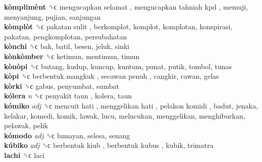 \textbf{kòmplimènt} ␝ϲ   mengucapkan selamat ,  mengucapkan tahniah kpd , memuji, menyanjung, pujian, sanjungan  \\
\textbf{kòmplòt} ␝ϲ   pakatan sulit , berkomplot, komplot, komplotan, konspirasi, pakatan, pengkomplotan, persubahatan  \\
\textbf{kònchi} ␝ϲ  bak, batil, besen, jeluk, sinki  \\
\textbf{kònkòmber} ␝ϲ  ketimun, mentimun, timun  \\
\textbf{kònòpi} ␝ϲ  butang, kudup, kuncup, kuntum, punat, putik, tombol, tunas  \\
\textbf{kòpi} ␝ϲ   berbentuk mangkuk ,  secawan penuh , cangkir, cawan, gelas  \\
\textbf{kòrki} ␝ϲ  gabus, penyumbat, sumbat  \\
\textbf{kólera} \emph{n}  ␝ϲ   penyakit taun , kolera, taun  \\
\textbf{kómiko} \emph{adj}  ␝ϲ   mencuit hati ,  menggelikan hati ,  pelakon komidi , badut, jenaka, kelakar, komedi, komik, lawak, lucu, melucukan, menggelikan, menghiburkan, pelawak, pelik  \\
\textbf{kómodo} \emph{adj}  ␝ϲ  lumayan, selesa, senang  \\
\textbf{kúbiko} \emph{adj}  ␝ϲ   berbentuk kiub ,  berbentuk kubus , kubik, trimatra  \\
\textbf{lachi} ␝ϲ  laci  \\
